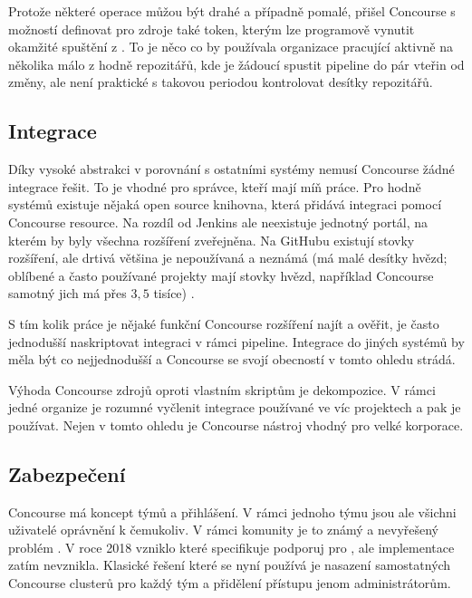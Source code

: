         Protože některé  operace můžou být drahé a případně pomalé, přišel Concourse s možností definovat pro zdroje také token, kterým lze programově vynutit okamžité spuštění  z . To je něco co by používala organizace pracující aktivně na několika málo z hodně repozitářů, kde je žádoucí spustit pipeline do pár vteřin od změny, ale není praktické s takovou periodou kontrolovat desítky repozitářů.

    \subsection{Integrace}
        Díky vysoké abstrakci v porovnání s ostatními \CI systémy nemusí Concourse žádné integrace řešit. To je vhodné pro správce, kteří mají míň práce. Pro hodně systémů existuje nějaká open source knihovna, která přidává integraci pomocí Concourse resource. Na rozdíl od Jenkins ale neexistuje jednotný portál, na kterém by byly všechna rozšíření zveřejněna. Na GitHubu existují stovky rozšíření, ale drtivá většina je nepoužívaná a neznámá (má malé desítky hvězd; oblíbené a často používané projekty mají stovky hvězd, například Concourse samotný jich má přes $3,5$ tisíce) \cite{concourse-resource-list}.

        S tím kolik práce je nějaké funkční Concourse rozšíření najít a ověřit, je často jednodušší naskriptovat integraci v rámci pipeline. Integrace \CI do jiných systémů by měla být co nejjednodušší a Concourse se svojí obecností v tomto ohledu strádá.

        Výhoda Concourse zdrojů oproti vlastním skriptům je dekompozice. V rámci jedné organize je rozumné vyčlenit integrace používané ve víc projektech a pak je používat. Nejen v tomto ohledu je Concourse nástroj vhodný pro velké korporace.

    \subsection{Zabezpečení}
        \label{subsec:concourse-security}

        Concourse má koncept týmů a přihlášení. V rámci jednoho týmu jsou ale všichni uživatelé oprávnění k čemukoliv. V rámci komunity je to známý a nevyřešený problém \cite{concourse-issue-1317}. V roce 2018 vzniklo  které specifikuje podporuj pro , ale implementace zatím nevznikla. Klasické řešení které se nyní používá je nasazení samostatných Concourse clusterů pro každý tým a přidělení přístupu jenom administrátorům.

